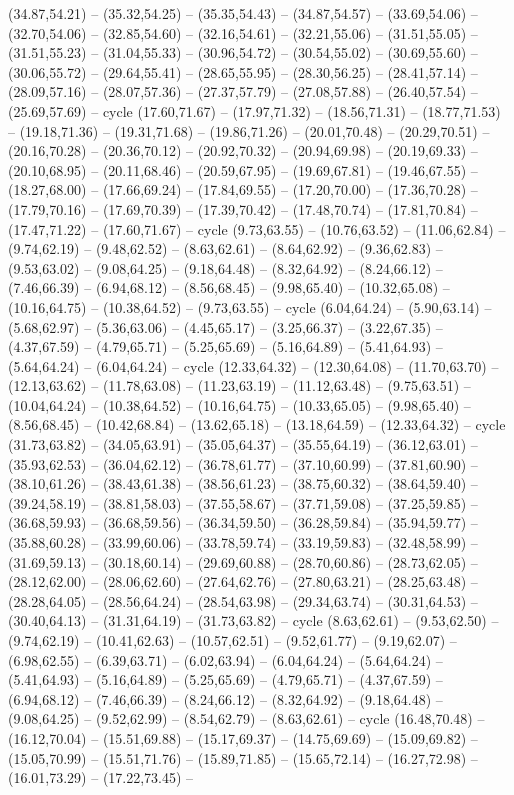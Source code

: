 {(34.87,54.21) -- (35.32,54.25) -- (35.35,54.43) -- (34.87,54.57) -- (33.69,54.06) -- (32.70,54.06) -- (32.85,54.60) -- (32.16,54.61) -- (32.21,55.06) -- (31.51,55.05) -- (31.51,55.23) -- (31.04,55.33) -- (30.96,54.72) -- (30.54,55.02) -- (30.69,55.60) -- (30.06,55.72) -- (29.64,55.41) -- (28.65,55.95) -- (28.30,56.25) -- (28.41,57.14) -- (28.09,57.16) -- (28.07,57.36) -- (27.37,57.79) -- (27.08,57.88) -- (26.40,57.54) -- (25.69,57.69) -- cycle (17.60,71.67) -- (17.97,71.32) -- (18.56,71.31) -- (18.77,71.53) -- (19.18,71.36) -- (19.31,71.68) -- (19.86,71.26) -- (20.01,70.48) -- (20.29,70.51) -- (20.16,70.28) -- (20.36,70.12) -- (20.92,70.32) -- (20.94,69.98) -- (20.19,69.33) -- (20.10,68.95) -- (20.11,68.46) -- (20.59,67.95) -- (19.69,67.81) -- (19.46,67.55) -- (18.27,68.00) -- (17.66,69.24) -- (17.84,69.55) -- (17.20,70.00) -- (17.36,70.28) -- (17.79,70.16) -- (17.69,70.39) -- (17.39,70.42) -- (17.48,70.74) -- (17.81,70.84) -- (17.47,71.22) -- (17.60,71.67) -- cycle (9.73,63.55) -- (10.76,63.52) -- (11.06,62.84) -- (9.74,62.19) -- (9.48,62.52) -- (8.63,62.61) -- (8.64,62.92) -- (9.36,62.83) -- (9.53,63.02) -- (9.08,64.25) -- (9.18,64.48) -- (8.32,64.92) -- (8.24,66.12) -- (7.46,66.39) -- (6.94,68.12) -- (8.56,68.45) -- (9.98,65.40) -- (10.32,65.08) -- (10.16,64.75) -- (10.38,64.52) -- (9.73,63.55) -- cycle (6.04,64.24) -- (5.90,63.14) -- (5.68,62.97) -- (5.36,63.06) -- (4.45,65.17) -- (3.25,66.37) -- (3.22,67.35) -- (4.37,67.59) -- (4.79,65.71) -- (5.25,65.69) -- (5.16,64.89) -- (5.41,64.93) -- (5.64,64.24) -- (6.04,64.24) -- cycle (12.33,64.32) -- (12.30,64.08) -- (11.70,63.70) -- (12.13,63.62) -- (11.78,63.08) -- (11.23,63.19) -- (11.12,63.48) -- (9.75,63.51) -- (10.04,64.24) -- (10.38,64.52) -- (10.16,64.75) -- (10.33,65.05) -- (9.98,65.40) -- (8.56,68.45) -- (10.42,68.84) -- (13.62,65.18) -- (13.18,64.59) -- (12.33,64.32) -- cycle (31.73,63.82) -- (34.05,63.91) -- (35.05,64.37) -- (35.55,64.19) -- (36.12,63.01) -- (35.93,62.53) -- (36.04,62.12) -- (36.78,61.77) -- (37.10,60.99) -- (37.81,60.90) -- (38.10,61.26) -- (38.43,61.38) -- (38.56,61.23) -- (38.75,60.32) -- (38.64,59.40) -- (39.24,58.19) -- (38.81,58.03) -- (37.55,58.67) -- (37.71,59.08) -- (37.25,59.85) -- (36.68,59.93) -- (36.68,59.56) -- (36.34,59.50) -- (36.28,59.84) -- (35.94,59.77) -- (35.88,60.28) -- (33.99,60.06) -- (33.78,59.74) -- (33.19,59.83) -- (32.48,58.99) -- (31.69,59.13) -- (30.18,60.14) -- (29.69,60.88) -- (28.70,60.86) -- (28.73,62.05) -- (28.12,62.00) -- (28.06,62.60) -- (27.64,62.76) -- (27.80,63.21) -- (28.25,63.48) -- (28.28,64.05) -- (28.56,64.24) -- (28.54,63.98) -- (29.34,63.74) -- (30.31,64.53) -- (30.40,64.13) -- (31.31,64.19) -- (31.73,63.82) -- cycle (8.63,62.61) -- (9.53,62.50) -- (9.74,62.19) -- (10.41,62.63) -- (10.57,62.51) -- (9.52,61.77) -- (9.19,62.07) -- (6.98,62.55) -- (6.39,63.71) -- (6.02,63.94) -- (6.04,64.24) -- (5.64,64.24) -- (5.41,64.93) -- (5.16,64.89) -- (5.25,65.69) -- (4.79,65.71) -- (4.37,67.59) -- (6.94,68.12) -- (7.46,66.39) -- (8.24,66.12) -- (8.32,64.92) -- (9.18,64.48) -- (9.08,64.25) -- (9.52,62.99) -- (8.54,62.79) -- (8.63,62.61) -- cycle (16.48,70.48) -- (16.12,70.04) -- (15.51,69.88) -- (15.17,69.37) -- (14.75,69.69) -- (15.09,69.82) -- (15.05,70.99) -- (15.51,71.76) -- (15.89,71.85) -- (15.65,72.14) -- (16.27,72.98) -- (16.01,73.29) -- (17.22,73.45) -- }
